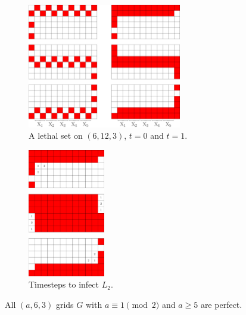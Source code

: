 \begin{figure}[]
\centering
\includegraphics[width=0.6\textwidth]{figures/7/6x12x3.pdf}
\caption{A lethal set on $(6,12,3)$, $t=0$ and $t=1$.}
\label{fig:6x12x3}
\end{figure}

\begin{figure}[]
\centering
\includegraphics[width=0.3\textwidth]{figures/7/6x12x3_L2_numbered_heatmap.pdf}
\caption{Timesteps to infect $L_2$.}
\label{fig:6x12x3_timesteps}
\end{figure}

\begin{con}
\label{con:3x6xodd}
All $(a,6,3)$ grids $G$ with $a \equiv 1 \pmod 2$ and $a \geq 5$ are perfect. 
\end{con}


